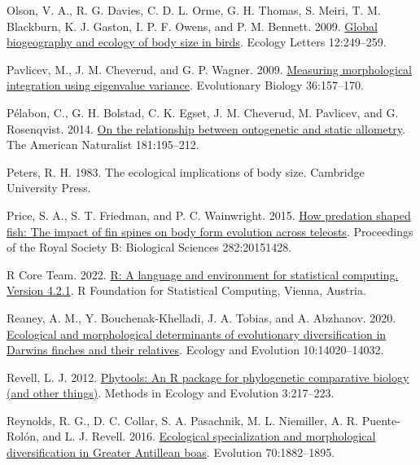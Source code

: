 \documentclass[
  11pt,
]{article}
\newlength{\cslhangindent}
\newlength{\cslentryspacingunit} %
\newenvironment{CSLReferences}[2] %
 {%
  \setlength{\parindent}{0pt}
  \ifodd #1
  \let\oldpar\par
  \def\par{\hangindent=\cslhangindent\oldpar}
  \fi
  \setlength{\parskip}{#2\cslentryspacingunit}
 }%
 {}
\begin{document}
\begin{CSLReferences}{1}{0}
\leavevmode{}%
Olson, V. A., R. G. Davies, C. D. L. Orme, G. H. Thomas, S. Meiri, T. M.
Blackburn, K. J. Gaston, I. P. F. Owens, and P. M. Bennett. 2009.
\href{https://doi.org/10.1111/j.1461-0248.2009.01281.x}{Global
biogeography and ecology of body size in birds}. Ecology Letters
12:249--259.

\leavevmode{}%
Pavlicev, M., J. M. Cheverud, and G. P. Wagner. 2009.
\href{https://doi.org/10.1007/s11692-008-9042-7}{Measuring morphological
integration using eigenvalue variance}. Evolutionary Biology
36:157--170.

\leavevmode{}%
Pélabon, C., G. H. Bolstad, C. K. Egset, J. M. Cheverud, M. Pavlicev,
and G. Rosenqvist. 2014. \href{https://doi.org/10.1086/668820}{On the
relationship between ontogenetic and static allometry}. The American
Naturalist 181:195--212.

\leavevmode{}%
Peters, R. H. 1983. The ecological implications of body size. Cambridge
University Press.

\leavevmode{}%
Price, S. A., S. T. Friedman, and P. C. Wainwright. 2015.
\href{https://doi.org/10.1098/rspb.2015.1428}{How predation shaped fish:
The impact of fin spines on body form evolution across teleosts}.
Proceedings of the Royal Society B: Biological Sciences 282:20151428.

\leavevmode{}%
R Core Team. 2022. \href{https://www.R-project.org/}{R: A language and
environment for statistical computing. Version 4.2.1}. R Foundation for
Statistical Computing, Vienna, Austria.

\leavevmode{}%
Reaney, A. M., Y. Bouchenak-Khelladi, J. A. Tobias, and A. Abzhanov.
2020. \href{https://doi.org/10.1002/ece3.6994}{Ecological and
morphological determinants of evolutionary diversification in
{D}arwin{\textquotesingle}s finches and their relatives}. Ecology and
Evolution 10:14020--14032.

\leavevmode{}%
Revell, L. J. 2012.
\href{https://doi.org/10.1111/j.2041-210X.2011.00169.x}{Phytools: An {R}
package for phylogenetic comparative biology (and other things)}.
Methods in Ecology and Evolution 3:217--223.

\leavevmode{}%
Reynolds, R. G., D. C. Collar, S. A. Pasachnik, M. L. Niemiller, A. R.
Puente-Rolón, and L. J. Revell. 2016.
\href{https://doi.org/10.1111/evo.12987}{{Ecological specialization and
morphological diversification in {G}reater {A}ntillean boas}}. Evolution
70:1882--1895.


\end{CSLReferences}
\end{document}
